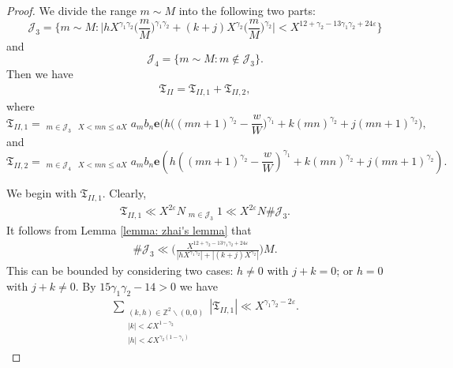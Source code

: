 \documentclass[12pt, reqno, twoside, letterpaper]{amsart}
\numberwithin{equation}{section}
\newcommand{\cL}{\ensuremath{\mathcal{L}}}
\newcommand{\ZZ}{\ensuremath{\mathbb{Z}}}
\theoremstyle{customthm}
\theoremstyle{customrem}
\begin{document}
\begin{proof}
	We divide the range $m\sim M$ into the following two parts:
	$$
	\mathcal{J}_3=\bigg\{m\sim M:
	\bigg|hX^{\gamma_1\gamma_2}
	\Big(\frac{m}{M}\Big)^{\gamma_1\gamma_2}
	+(k+j)X^{\gamma_2}\Big(\frac{m}{M}\Big)^{\gamma_2}\bigg|
	<X^{12+\gamma_2-13\gamma_1\gamma_2+24\varepsilon}\bigg\}
	$$
	and
	$$
	\mathcal{J}_4=\{m\sim M: m\notin\mathcal{J}_3\}.
	$$
	Then we have
	\begin{align*}
		\mathfrak{T}_{II}=\mathfrak{T}_{II,1}+\mathfrak{T}_{II,2},
	\end{align*}
	where
	$$
	\mathfrak{T}_{II,1}=\mathop{\sum_{m\sim M}}_{m\in\mathcal{J}_3}\mathop{\sum_{n\sim N}}_{X < mn \leqslant aX}
	a_mb_n\mathbf{e}\Big(h\Big((mn+1)^{\gamma_2}-\frac{w}{W}\Big)^{\gamma_1}
	+k(mn)^{\gamma_2}+j(mn+1)^{\gamma_2}\Big),
	$$
	and
	$$
	\mathfrak{T}_{II,2}=\mathop{\sum_{m\sim M}}_{m\in\mathcal{J}_4}\mathop{\sum_{n\sim N}}_{X < mn \leqslant aX}
	a_mb_n\mathbf{e}\left(h\left((mn+1)^{\gamma_2}-\frac{w}{W}\right)^{\gamma_1}
	+k(mn)^{\gamma_2}+j(mn+1)^{\gamma_2}\right).
	$$
	
	We begin with $\mathfrak{T}_{II,1}$. Clearly,
	\begin{align*}
		\mathfrak{T}_{II,1}\ll X^{2\varepsilon}N\mathop{\sum_{m\sim M}}_{m\in\mathcal{J}_3}1
		\ll X^{2\varepsilon}N\#\mathcal{J}_3.
	\end{align*}
	It follows from Lemma \ref{lemma: zhai's lemma} that
	\begin{align*}
		\#\mathcal{J}_3\ll \bigg(\frac{X^{12+\gamma_2-13\gamma_1\gamma_2+24\varepsilon}}
		{|hX^{\gamma_1\gamma_2}|
			+|(k+j)X^{\gamma_2}|}\bigg)M.
	\end{align*}
This can be bounded by considering two cases: $h\neq0$ with $j+k=0$; or $h=0$
   with $j+k\neq0$. By $15\gamma_1\gamma_2-14>0$ we have
	\begin{align*}
		\sum_{\substack{(k,h) \in \ZZ^2 \backslash (0,0) \\ |k|<\cL X^{1-\gamma_2} \\ |h|<\cL X^{\gamma_2(1-\gamma_1)}}}|\mathfrak{T}_{II,1}|
		\ll X^{\gamma_1\gamma_2-2\varepsilon}.
	\end{align*}
	

\end{proof}
\end{document}
